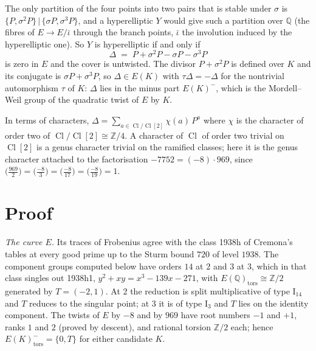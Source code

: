\documentclass[11pt,reqno]{amsart}
\theoremstyle{plain}
\theoremstyle{definition}
\DeclareMathOperator{\Cl}{Cl}
\newcommand{\Q}{\mathbb{Q}}
\newcommand{\Z}{\mathbb{Z}}
\begin{document}
The only partition of the four points into two pairs that is stable under $\sigma$ is
$\{P,\sigma^2P\}\,|\,\{\sigma P,\sigma^3P\}$, and a hyperelliptic $Y$ would give such a partition over $\Q$
(the fibres of $E\to E/\bar\iota$ through the branch points, $\bar\iota$ the involution induced by the
hyperelliptic one). So $Y$ is hyperelliptic if and only if
\[
\Delta \;=\; P+\sigma^2P-\sigma P-\sigma^3P
\]
is zero in $E$ and the cover is untwisted. The divisor $P+\sigma^2P$ is defined over $K$ and its conjugate
is $\sigma P+\sigma^3P$, so $\Delta\in E(K)$ with $\tau\Delta=-\Delta$ for the nontrivial automorphism $\tau$ of
$K$: $\Delta$ lies in the minus part $E(K)^-$, which is the Mordell--Weil group of the quadratic twist of $E$ by
$K$.

In terms of characters, $\Delta=\sum_{a\in\Cl/\Cl[2]}\chi(a)\,P^a$ where $\chi$ is the character of order two
of $\Cl/\Cl[2]\cong\Z/4$. A character of $\Cl$ of order two trivial on $\Cl[2]$ is a genus character trivial
on the ramified classes; here it is the genus character attached to the factorisation
$-7752=(-8)\cdot969$, since $\bigl(\tfrac{969}{2}\bigr)=\bigl(\tfrac{-8}{3}\bigr)=\bigl(\tfrac{-8}{17}\bigr)=
\bigl(\tfrac{-8}{19}\bigr)=1$.

\section{Proof}

\emph{The curve $E$.} Its traces of Frobenius agree with the class 1938h of Cremona's tables at every good
prime up to the Sturm bound $720$ of level $1938$. The component groups computed below have orders $14$ at $2$
and $3$ at $3$, which in that class singles out 1938h1, $y^2+xy=x^3-139x-271$, with
$E(\Q)_{\mathrm{tors}}\cong\Z/2$ generated by $T=(-2,1)$. At $2$ the reduction is split multiplicative of type
$\mathrm{I}_{14}$ and $T$ reduces to the singular point; at $3$ it is of type $\mathrm{I}_3$ and $T$ lies on the
identity component. The twists of $E$ by $-8$ and by $969$ have root numbers $-1$ and $+1$, ranks $1$ and $2$
(proved by descent), and rational torsion $\Z/2$ each; hence $E(K)^-_{\mathrm{tors}}=\{0,T\}$ for either
candidate $K$.
\end{document}
